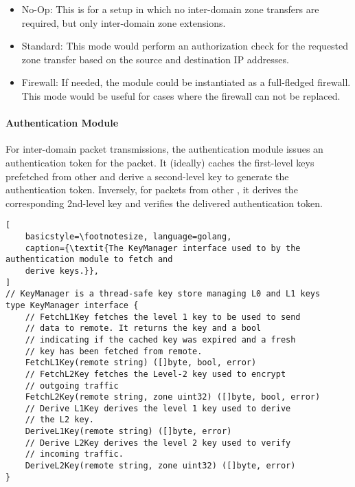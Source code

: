\begin{itemize}
	\item No-Op: This is for a setup in which no inter-domain zone transfers are required,
	      but only inter-domain zone extensions.
	\item Standard: This mode would perform an authorization check for the requested
	      zone transfer based on the source and destination IP addresses.
	\item Firewall: If needed, the module could be instantiated as a full-fledged firewall.
	      This mode would be useful for cases where the firewall can not be replaced.
\end{itemize}

\paragraph{Authentication Module}
For inter-domain packet transmissions, the authentication module issues an
authentication token for the packet. It (ideally) caches the first-level keys prefetched
from other \tps and derive a second-level key to generate the authentication token.
Inversely, for packets from other \tps, it derives the corresponding 2nd-level key
and verifies the delivered authentication token. 

\begin{lstlisting}[
	basicstyle=\footnotesize, language=golang,
	caption={\textit{The KeyManager interface used to by the authentication module to fetch and
	derive keys.}},
]
// KeyManager is a thread-safe key store managing L0 and L1 keys
type KeyManager interface {
	// FetchL1Key fetches the level 1 key to be used to send
	// data to remote. It returns the key and a bool
	// indicating if the cached key was expired and a fresh
	// key has been fetched from remote.
	FetchL1Key(remote string) ([]byte, bool, error)
	// FetchL2Key fetches the Level-2 key used to encrypt
	// outgoing traffic
	FetchL2Key(remote string, zone uint32) ([]byte, bool, error)
	// Derive L1Key derives the level 1 key used to derive
	// the L2 key.
	DeriveL1Key(remote string) ([]byte, error)
	// Derive L2Key derives the level 2 key used to verify
	// incoming traffic.
	DeriveL2Key(remote string, zone uint32) ([]byte, error)
}
\end{lstlisting}


